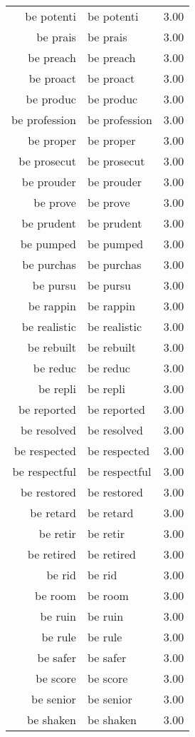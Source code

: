 \begin{table}[ht]
\begin{tabular}{rlr}
  be potenti & be potenti & 3.00 \\ 
  be prais & be prais & 3.00 \\ 
  be preach & be preach & 3.00 \\ 
  be proact & be proact & 3.00 \\ 
  be produc & be produc & 3.00 \\ 
  be profession & be profession & 3.00 \\ 
  be proper & be proper & 3.00 \\ 
  be prosecut & be prosecut & 3.00 \\ 
  be prouder & be prouder & 3.00 \\ 
  be prove & be prove & 3.00 \\ 
  be prudent & be prudent & 3.00 \\ 
  be pumped & be pumped & 3.00 \\ 
  be purchas & be purchas & 3.00 \\ 
  be pursu & be pursu & 3.00 \\ 
  be rappin & be rappin & 3.00 \\ 
  be realistic & be realistic & 3.00 \\ 
  be rebuilt & be rebuilt & 3.00 \\ 
  be reduc & be reduc & 3.00 \\ 
  be repli & be repli & 3.00 \\ 
  be reported & be reported & 3.00 \\ 
  be resolved & be resolved & 3.00 \\ 
  be respected & be respected & 3.00 \\ 
  be respectful & be respectful & 3.00 \\ 
  be restored & be restored & 3.00 \\ 
  be retard & be retard & 3.00 \\ 
  be retir & be retir & 3.00 \\ 
  be retired & be retired & 3.00 \\ 
  be rid & be rid & 3.00 \\ 
  be room & be room & 3.00 \\ 
  be ruin & be ruin & 3.00 \\ 
  be rule & be rule & 3.00 \\ 
  be safer & be safer & 3.00 \\ 
  be score & be score & 3.00 \\ 
  be senior & be senior & 3.00 \\ 
  be shaken & be shaken & 3.00 \\ 

\end{tabular}
\end{table}

